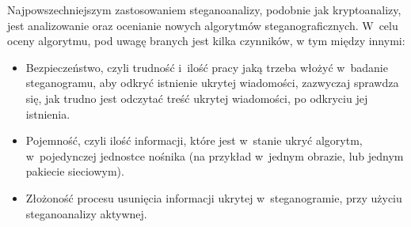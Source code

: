 \documentclass[a4paper, twoside, 12pt]{report}
\begin{document}
        Najpowszechniejszym zastosowaniem steganoanalizy, podobnie jak kryptoanalizy,
        jest analizowanie oraz ocenianie nowych algorytmów steganograficznych.
        W~celu oceny algorytmu, pod uwagę branych jest kilka czynników,
        w tym między innymi:
        \begin{itemize}
            \item Bezpieczeństwo, czyli trudność i~ilość pracy jaką trzeba włożyć
        w~badanie steganogramu, aby odkryć istnienie ukrytej wiadomości,
        zazwyczaj sprawdza się, jak trudno
        jest odczytać treść ukrytej wiadomości, po odkryciu jej istnienia.
            \item Pojemność, czyli
        ilość informacji, które jest w~stanie ukryć algorytm, w~pojedynczej jednostce
        nośnika (na przykład w~jednym obrazie, lub jednym pakiecie sieciowym).
            \item Złożoność procesu usunięcia informacji ukrytej w~steganogramie, przy
        użyciu steganoanalizy aktywnej.
        \end{itemize}
\end{document}
